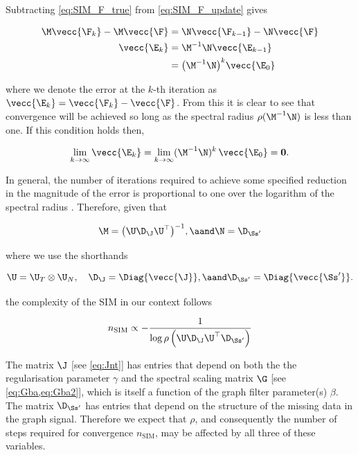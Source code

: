 Subtracting \cref{eq:SIM_F_true} from \cref{eq:SIM_F_update} gives

\begin{align}
    \M \vecc{\F_k} - \M \vecc{\F} &= \N \vecc{\F_{k-1}} - \N \vecc{\F}  \notag \\
    \vecc{\E_k} &= \M^{-1} \N \vecc{\E_{k-1}} \notag \\
     &= \big( \M^{-1} \N \big)^{k} \vecc{\E_{0}}
\end{align}

where we denote the error at the $k$-th iteration as $\vecc{\E_k} = \vecc{\F_k} - \vecc{\F}$. From this it is clear to see that convergence will be achieved so long as the spectral radius $\rho(\M^{-1}\N)$ is less than one. If this condition holds then,

\begin{equation}
    \lim_{k \rightarrow \infty} \vecc{\E_{k}} = \lim_{k \rightarrow \infty} (\M^{-1} \N)^{k} \, \vecc{\E_0} = \mathbf{0} .
\end{equation}

In general, the number of iterations required to achieve some specified reduction in the magnitude of the error is proportional to one over the logarithm of the spectral radius \citep{Demmel1997}. Therefore, given that 

$$
\M = \big(\U \D_\J \U^\top\big)^{-1}, \aand \N = \D_{\Ss'}
$$

where we use the shorthands

$$
\U = \U_T \otimes \U_N, \quad \D_\J = \Diag{\vecc{\J}}, \aand \D_{\Ss'} = \Diag{\vecc{\Ss'}}. 
$$



the complexity of the SIM in our context follows


\begin{equation}
    \label{eq:n_SIM}
    n_{\text{SIM}} \propto  -\frac{1}{\log\rho\left(\U \D_\J \U^\top \D_{\Ss'} \right)}
\end{equation}

The matrix $\J$ [see \cref{eq:Jnt}] has entries that depend on both the the regularisation parameter $\gamma$ and the spectral scaling matrix $\G$ [see \cref{eq:Gba,eq:Gba2}], which is itself a function of the graph filter parameter(s) $\beta$. The matrix $\D_{\Ss'}$  has entries that depend on the structure of the missing data in the graph signal. Therefore we expect that $\rho$, and consequently the number of steps required for convergence $n_{\text{SIM}}$, may be affected by all three of these variables.  


